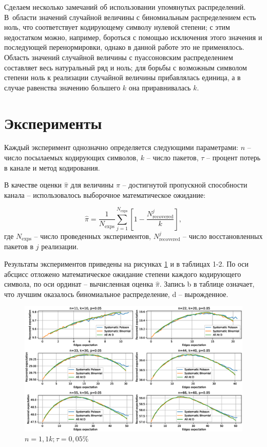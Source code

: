 Сделаем несколько замечаний об использовании упомянутых распределений.
В~области значений случайной величины с биномиальным распределением есть ноль, 
что соответствует кодирующему символу нулевой степени; 
с этим недостатком можно, например, бороться с помощью исключения этого значения
и последующей перенормировки, однако в данной работе это
не применялось. Область значений случайной величины с пуассоновским
распределением составляет весь натуральный ряд и ноль; для борьбы 
с возможным символом степени ноль к реализации случайной величины
прибавлялась единица, а в случае равенства значению большего $k$ 
она приравнивалась $k$.

\section{Эксперименты}

Каждый эксперимент однозначно определяется
следующими параметрами: $n$ -- число посылаемых
кодирующих символов, $k$ -- число пакетов, 
$\tau$ -- процент потерь в канале и метод кодирования. 

В качестве оценки $\hat\pi$ для величины $\pi$ -- 
достигнутой пропускной способности канала --  использовалось выборочное 
математическое ожидание:

\[
    \hat\pi = \frac{1}{N_{\mathrm{exps}}}\sum_{j=1}^{N_{\mathrm{exps}}} 
    \left[ 1-
    \frac{N^j_{\mathrm{recovered}}}{k} \right],
\]
где $N_{\mathrm{exps}}$ -- число проведенных экспериментов,
$N_{\mathrm{recovered}}^j$ -- число восстановленных пакетов в $j$ реализации.

Результаты экспериментов приведены на рисунках 
\ref{fig:exp1} и в таблицах 1-2.
По оси абсцисс отложено математическое ожидание
степени каждого кодирующего символа,
по оси ординат -- вычисленная оценка $\hat\pi$.
Запись b в таблице означает, что лучшим оказалось биномиальное распределение,
d -- вырожденное.

\begin{figure}[ht]
    \centering
    \includegraphics[scale=0.55]{img/exp1.eps}
    \caption{$n=1{,}1k; \tau=0{,}05\%$}
    \label{fig:exp1}
\end{figure}

